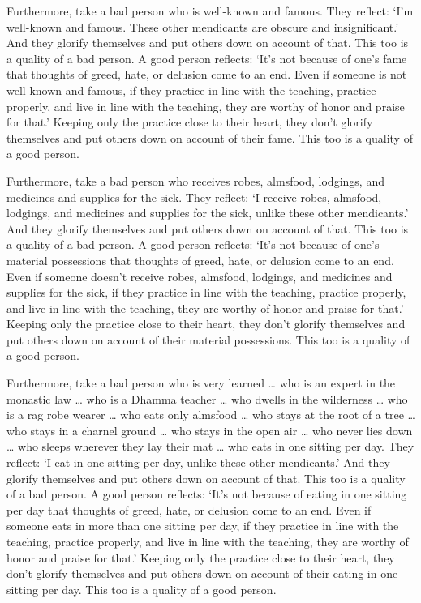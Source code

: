 \documentclass[12pt,openany]{book}%
\begin{document}
Furthermore, take a bad person who is well-known and famous. They reflect: ‘I’m well-known and famous. These other mendicants are obscure and insignificant.’ And they glorify themselves and put others down on account of that. This too is a quality of a bad person. A good person reflects: ‘It’s not because of one’s fame that thoughts of greed, hate, or delusion come to an end. Even if someone is not well-known and famous, if they practice in line with the teaching, practice properly, and live in line with the teaching, they are worthy of honor and praise for that.’ Keeping only the practice close to their heart, they don’t glorify themselves and put others down on account of their fame. This too is a quality of a good person. 

Furthermore, take a bad person who receives robes, almsfood, lodgings, and medicines and supplies for the sick. They reflect: ‘I receive robes, almsfood, lodgings, and medicines and supplies for the sick, unlike these other mendicants.’ And they glorify themselves and put others down on account of that. This too is a quality of a bad person. A good person reflects: ‘It’s not because of one’s material possessions that thoughts of greed, hate, or delusion come to an end. Even if someone doesn’t receive robes, almsfood, lodgings, and medicines and supplies for the sick, if they practice in line with the teaching, practice properly, and live in line with the teaching, they are worthy of honor and praise for that.’ Keeping only the practice close to their heart, they don’t glorify themselves and put others down on account of their material possessions. This too is a quality of a good person. 

Furthermore, take a bad person who is very learned … who is an expert in the monastic law … who is a Dhamma teacher … who dwells in the wilderness … who is a rag robe wearer … who eats only almsfood … who stays at the root of a tree … who stays in a charnel ground … who stays in the open air … who never lies down … who sleeps wherever they lay their mat … who eats in one sitting per day. They reflect: ‘I eat in one sitting per day, unlike these other mendicants.’ And they glorify themselves and put others down on account of that. This too is a quality of a bad person. A good person reflects: ‘It’s not because of eating in one sitting per day that thoughts of greed, hate, or delusion come to an end. Even if someone eats in more than one sitting per day, if they practice in line with the teaching, practice properly, and live in line with the teaching, they are worthy of honor and praise for that.’ Keeping only the practice close to their heart, they don’t glorify themselves and put others down on account of their eating in one sitting per day. This too is a quality of a good person. 
\end{document}
